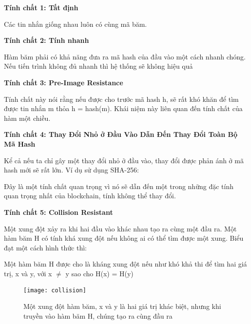 {\textbf{Tính chất 1: Tất định}

Các tin nhắn giống nhau luôn có cùng mã băm.

\textbf{Tính chất 2: Tính nhanh}

Hàm băm phải có khả năng đưa ra mã hash của đầu vào một cách nhanh chóng. Nếu tiến trình không đủ nhanh thì hệ thống sẽ không hiệu quả

\textbf{Tính chất 3: Pre-Image Resistance}

Tính chất này nói rằng nếu được cho trước mã hash h, sẽ rất khó khăn để tìm được tin nhắn m thỏa h = hash(m). Khái niệm này liên quan đến tính chất của hàm một chiều.

\textbf{Tính chất 4: Thay Đổi Nhỏ ở Đầu Vào Dẫn Đến Thay Đổi Toàn Bộ Mã Hash}

Kể cả nếu ta chỉ gây một thay đổi nhỏ ở đầu vào, thay đổi được phản ánh ở mã hash mới sẽ rất lớn. Ví dụ sử dụng SHA-256:

%		
%	

Đây là một tính chất quan trọng vì nó sẽ dẫn đến một trong những đặc tính quan trọng nhất của blockchain, tính không thể thay đổi.

\textbf{Tính chất 5: Collision Resistant}

Một xung đột xảy ra khi hai đầu vào khác nhau tạo ra cùng một đầu ra. Một hàm băm H có tính khá xung đột nếu không ai có thể tìm được một xung. Biểu đạt một cách hình thức thì:

Một hàm băm H được cho là kháng xung đột nếu như khó khả thi để tìm hai giá trị, x và y,  với x $\neq$ y sao cho H(x) = H(y)


 \begin{figure}[h]
	\centering	\texttt{[image: collision]}
	\caption{Một xung đột hàm băm, x và y là hai giá trị khác biệt, nhưng khi truyền vào hàm băm H, chúng tạo ra cùng đầu ra}
\end{figure}

}
